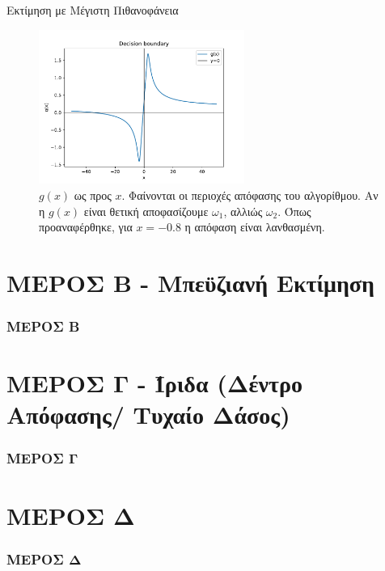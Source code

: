 \documentclass{beamer}
\begin{document}
\begin{frame}{Εκτίμηση με Μέγιστη Πιθανοφάνεια}
    \begin{figure}
        \centering
            \includegraphics[width=0.6\textwidth]{./plots/DB1.pdf}
            \caption{$g(x)$ ως προς $x$. Φαίνονται οι περιοχές απόφασης του αλγορίθμου. Αν 
            η $g(x)$ είναι θετική αποφασίζουμε $\omega_1$, αλλιώς $\omega_2$. Όπως προαναφέρθηκε, 
            για $x=-0.8$ η απόφαση είναι λανθασμένη.}
            \label{fig:DB1}
    \end{figure}

    
\end{frame}



\section{ΜΕΡΟΣ Β - Μπεϋζιανή Εκτίμηση}

\begin{frame}
    \frametitle{ΜΕΡΟΣ Β}
    
    
\end{frame}




\section{ΜΕΡΟΣ Γ - Ίριδα (Δέντρο Απόφασης/ Τυχαίο Δάσος)}
\begin{frame}
    \frametitle{ΜΕΡΟΣ Γ}
    
    
\end{frame}




\section{ΜΕΡΟΣ Δ}

\begin{frame}
    \frametitle{ΜΕΡΟΣ Δ}
    
    
\end{frame}
\end{document}
